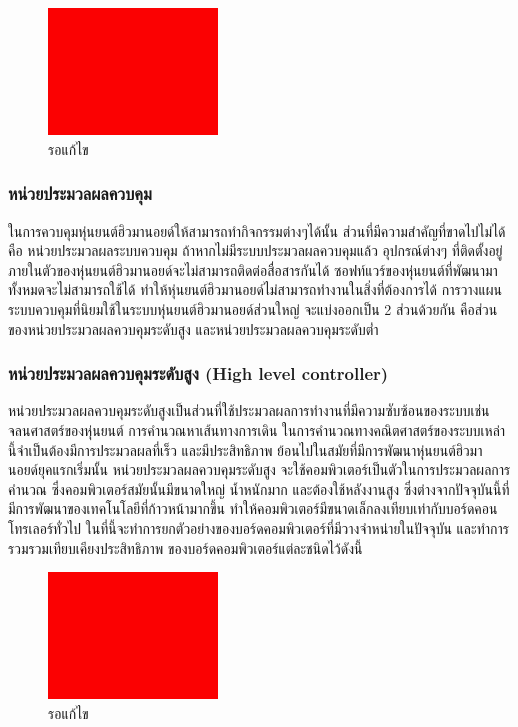 \begin{figure}[ht]
    \centering
    \includegraphics[width=0.40\textwidth]{chapter2/images/toedit.jpg}
    \caption{รอแก้ไข}
    \label{fig:toedit}
\end{figure}
\subsubsection{หน่วยประมวลผลควบคุม}
ในการควบคุมหุ่นยนต์ฮิวมานอยด์ให้สามารถทำกิจกรรมต่างๆได้นั้น ส่วนที่มีความสำคัญที่ขาดไปไม่ได้ คือ
หน่วยประมวลผลระบบควบคุม ถ้าหากไม่มีระบบประมวลผลควบคุมแล้ว อุปกรณ์ต่างๆ ที่ติดตั้งอยู่ภายในตัวของหุ่นยนต์ฮิวมานอยด์จะไม่สามารถติดต่อสื่อสารกันได้
ซอฟท์แวร์ของหุ่นยนต์ที่พัฒนามาทั้งหมดจะไม่สามารถใช้ได้ ทำให้หุ่นยนต์ฮิวมานอยด์ไม่สามารถทำงานในสิ่งที่ต้องการได้ 
การวางแผนระบบควบคุมที่นิยมใช้ในระบบหุ่นยนต์ฮิวมานอยด์ส่วนใหญ่ จะแบ่งออกเป็น 2 ส่วนด้วยกัน 
คือส่วนของหน่วยประมวลผลควบคุมระดับสูง และหน่วยประมวลผลควบคุมระดับต่ำ

\subsubsection*{หน่วยประมวลผลควบคุมระดับสูง (High level controller)}
หน่วยประมวลผลควบคุมระดับสูงเป็นส่วนที่ใช้ประมวลผลการทำงานที่มีความซับซ้อนของระบบเช่น
จลนศาสตร์ของหุ่นยนต์ การคำนวณหาเส้นทางการเดิน ในการคำนวณทางคณิตศาสตร์ของระบบเหล่านี้จำเป็นต้องมีการประมวลผลที่เร็ว
และมีประสิทธิภาพ ย้อนไปในสมัยที่มีการพัฒนาหุ่นยนต์ฮิวมานอยด์ยุคแรกเริ่มนั้น หน่วยประมวลผลควบคุมระดับสูง
จะใช้คอมพิวเตอร์เป็นตัวในการประมวลผลการคำนวณ ซึ่งคอมพิวเตอร์สมัยนั้นมีขนาดใหญ่ น้ำหนักมาก
และต้องใช้หลังงานสูง ซึ่งต่างจากปัจจุบันนี้ที่มีการพัฒนาของเทคโนโลยีที่ก้าวหน้ามากขึ้น
ทำให้คอมพิวเตอร์มีขนาดเล็กลงเทียบเท่ากับบอร์ดคอนโทรเลอร์ทั่วไป ในที่นี้จะทำการยกตัวอย่างของบอร์ดคอมพิวเตอร์ที่มีวางจำหน่ายในปัจจุบัน
และทำการรวมรวมเทียบเคียงประสิทธิภาพ ของบอร์ดคอมพิวเตอร์แต่ละชนิดไว้ดังนี้
\begin{figure}[ht]
    \centering
    \includegraphics[width=0.40\textwidth]{chapter2/images/toedit.jpg}
    \caption{รอแก้ไข}
    \label{fig:toedit}
\end{figure}

